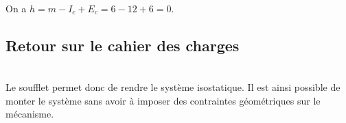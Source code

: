 \ifprof
\begin{corrige} ~\\
On a $h=m-I_c+E_c = 6-12+6 = 0$.
\end{corrige}
\else
\fi

\ifprof
\else
{}
\fi

\subsection*{Retour sur le cahier des charges}

\ifprof
\begin{corrige} ~\\
Le soufflet permet donc de rendre le système isostatique. Il est ainsi possible de monter le système sans avoir à imposer des contraintes géométriques sur le mécanisme. 
\end{corrige}
\else
\fi


